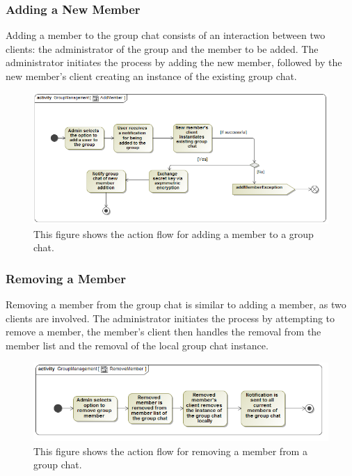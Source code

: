 \documentclass[11pt]{article}
\begin{document}
\subsubsection{Adding a New Member}
Adding a member to the group chat consists of an interaction between two clients: the administrator of the group and the member to be added. The administrator initiates the process by adding the new member, followed by the new member's client creating an instance of the existing group chat.
\begin{figure}[H]
\centering
\includegraphics[width=5in]{./images/activity_add_member.png}
\caption[Add Member Activity Diagram]{This figure shows the action flow for adding a member to a group chat.}
\label{ad-add-member}
\end{figure}
\subsubsection{Removing a Member}
Removing a member from the group chat is similar to adding a member, as two clients are involved. The administrator initiates the process by attempting to remove a member, the member's client then handles the removal from the member list and the removal of the local group chat instance.
\begin{figure}[H]
\centering
\includegraphics[width=5in]{./images/activity_remove_member.png}
\caption[Add Member Activity Diagram]{This figure shows the action flow for removing a member from a group chat.}
\label{ad-remove-member}
\end{figure}
\end{document}
